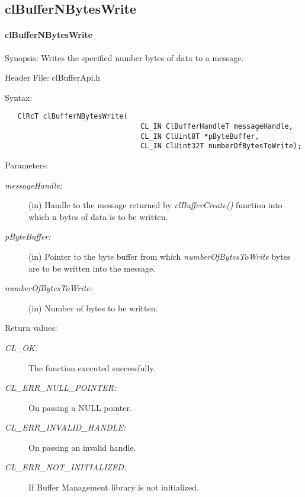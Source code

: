 \subsection{clBufferNBytesWrite}
\hypertarget{pagebuf109}{}\paragraph{cl\-Buffer\-NBytes\-Write}\label{pagebuf109}
\begin{Desc}
\item[Synopsis:]Writes the specified number bytes of data to a message.\end{Desc}
\begin{Desc}
\item[Header File:]clBufferApi.h\end{Desc}
\begin{Desc}
\item[Syntax:]

\footnotesize\begin{verbatim}   ClRcT clBufferNBytesWrite(
                           		CL_IN ClBufferHandleT messageHandle,
                           		CL_IN ClUint8T *pByteBuffer,
                           		CL_IN ClUint32T numberOfBytesToWrite);
\end{verbatim}
\normalsize
\end{Desc}
\begin{Desc}
\item[Parameters:]
\begin{description}
\item[{\em message\-Handle:}](in) Handle to the message returned by \textit{clBufferCreate()} function into which n bytes of data is to be written.
\item[{\em p\-Byte\-Buffer:}](in) Pointer to the byte buffer from which {\em number\-Of\-Bytes\-To\-Write\/} bytes are to be written into the message.
\item[{\em number\-Of\-Bytes\-To\-Write:}](in) Number of bytes to be written.\end{description}
\end{Desc}
\begin{Desc}
\item[Return values:]
\begin{description}
\item[{\em CL\_\-OK:}]The function executed successfully. \item[{\em CL\_\-ERR\_\-NULL\_\-POINTER:}]On passing a NULL pointer. \item[{\em CL\_\-ERR\_\-INVALID\_\-HANDLE:}]On passing an invalid handle. \item[{\em CL\_\-ERR\_\-NOT\_\-INITIALIZED:}]If Buffer Management library is not initialized.\end{description}
\end{Desc}
